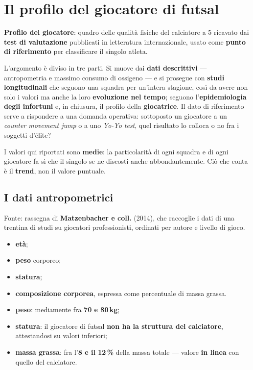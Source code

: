 \chapter{Il profilo del giocatore di futsal}
\label{cap:profilogiocatore}

\textbf{Profilo del giocatore}: quadro delle qualità fisiche del calciatore a 5 ricavato dai
\textbf{test di valutazione} pubblicati in letteratura internazionale, usato come \textbf{punto di
riferimento} per classificare il singolo atleta.

L'argomento è diviso in tre parti. Si muove dai \textbf{dati descrittivi} --- antropometria e
massimo consumo di ossigeno --- e si prosegue con \textbf{studi longitudinali} che seguono una
squadra per un'intera stagione, così da avere non solo i valori ma anche la loro
\textbf{evoluzione nel tempo}; seguono l'\textbf{epidemiologia degli infortuni} e, in chiusura, il
profilo della \textbf{giocatrice}. Il dato di riferimento serve a rispondere a una domanda
operativa: sottoposto un giocatore a un \textit{counter movement jump} o a uno \textit{Yo-Yo
test}, quel risultato lo colloca o no fra i soggetti d'élite?

I valori qui riportati sono \textbf{medie}: la particolarità di ogni squadra e di ogni giocatore fa
sì che il singolo se ne discosti anche abbondantemente. Ciò che conta è il \textbf{trend}, non il
valore puntuale.

\section{I dati antropometrici}

Fonte: rassegna di \textbf{Matzenbacher e coll.} (2014), che raccoglie i dati di una trentina di
studi su giocatori professionisti, ordinati per autore e livello di gioco.

\begin{itemize}
  \item \textbf{età};
  \item \textbf{peso} corporeo;
  \item \textbf{statura};
  \item \textbf{composizione corporea}, espressa come percentuale di massa grassa.
\end{itemize}

\begin{itemize}
  \item \textbf{peso}: mediamente fra \textbf{70 e 80\,kg};
  \item \textbf{statura}: il giocatore di futsal \textbf{non ha la struttura del calciatore},
    attestandosi su valori inferiori;
  \item \textbf{massa grassa}: fra l'\textbf{8 e il 12\,\%} della massa totale --- valore
    \textbf{in linea} con quello del calciatore.
\end{itemize}

